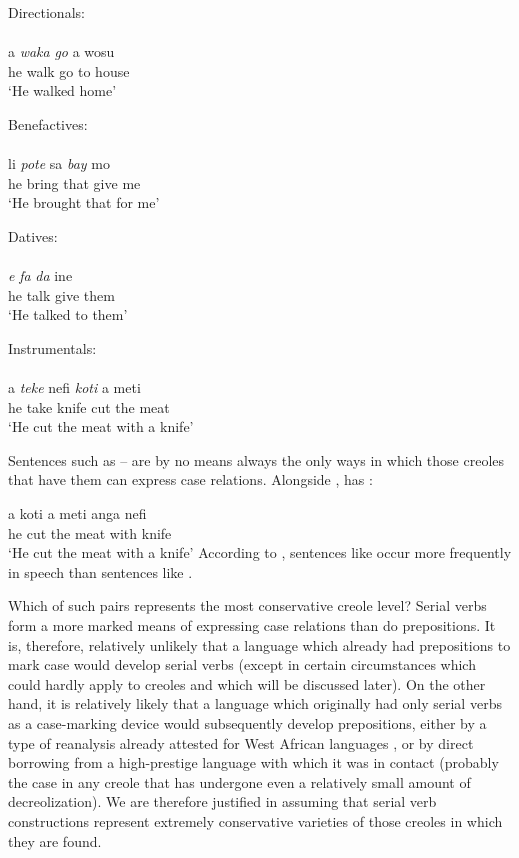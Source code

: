 \ea\label{ex:2:223}
Directionals:\\
\langinfo{\langSR}{}{}\\
\gll a \emph{waka} \emph{go} a wosu\\
he walk go to house \\
\glt `He walked home'
\z

\ea\label{ex:2:224}
Benefactives:\\
\langinfo{\langGU}{}{}\\
\gll li \emph{pote} sa \emph{bay} mo\\
he bring that give me\\
\glt `He brought that for me'
\z

\ea\label{ex:2:225}
Datives:\\
\langinfo{\langST}{}{}\\
\gll \emph{e} \emph{fa} \emph{da} ine \\
he talk give them \\
\glt `He talked to them'
\z

\ea\label{ex:2:226}
Instrumentals:\\
\\
\gll a \emph{teke} nefi \emph{koti} a meti \\
he take knife cut the meat\\
\glt `He cut the meat with a knife'
\z

Sentences such as -- are by no means always the only ways in which those creoles that have them can express case relations. Alongside ,  has :

\ea\label{ex:2:227}
\gll a koti a meti anga nefi\\
he cut the meat with knife\\
\glt `He cut the meat with a knife' 
\z
According to \citet{Huttar1975}, sentences like  occur more fre\-quently in speech than sentences like .

Which of such pairs represents the most conservative creole level? Serial verbs form a more marked means of expressing case rela\-tions than do prepositions. It is, therefore, relatively unlikely that a language which already had prepositions to mark case would develop serial verbs (except in certain circumstances which could hardly apply to creoles and which will be discussed later). On the other hand, it is relatively likely that a language which originally had only serial verbs as a case-marking device would subsequently develop prepositions, either by a type of reanalysis already attested for West African languages \citep{Lord1976}, or by direct borrowing from a high-prestige language with which it was in contact (probably the case in any creole that has undergone even a relatively small amount of decreolization). We are therefore justified in assuming that serial verb constructions represent extremely conservative varieties of those creoles in which they are found.

